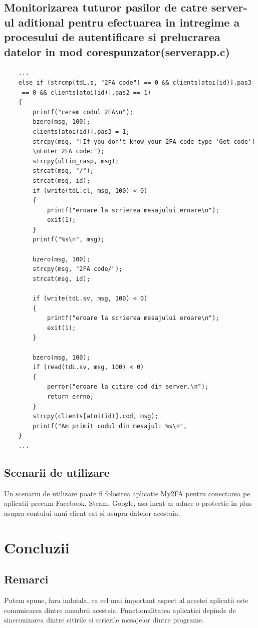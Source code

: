 \documentclass[runningheads]{llncs}
\begin{document}
\subsection{Monitorizarea tuturor pasilor de catre server-ul aditional pentru efectuarea in intregime a procesului de autentificare si prelucrarea datelor in mod corespunzator(serverapp.c)}
	\begin{verbatim}
	...
	else if (strcmp(tdL.s, "2FA code") == 0 && clients[atoi(id)].pas3
	 == 0 && clients[atoi(id)].pas2 == 1)
    {
        printf("cerem codul 2FA\n");
        bzero(msg, 100);
        clients[atoi(id)].pas3 = 1;
        strcpy(msg, "[If you don't know your 2FA code type 'Get code']
        \nEnter 2FA code:");
        strcpy(ultim_rasp, msg);
        strcat(msg, "/");
        strcat(msg, id);
        if (write(tdL.cl, msg, 100) < 0)
        {
            printf("eroare la scrierea mesajului eroare\n");
            exit(1);
        }
        printf("%s\n", msg);

        bzero(msg, 100);
        strcpy(msg, "2FA code/");
        strcat(msg, id);

        if (write(tdL.sv, msg, 100) < 0)
        {
            printf("eroare la scrierea mesajului eroare\n");
            exit(1);
        }

        bzero(msg, 100);
        if (read(tdL.sv, msg, 100) < 0)
        {
            perror("eroare la citire cod din server.\n");
            return errno;
        }
        strcpy(clients[atoi(id)].cod, msg);
        printf("Am primit codul din mesajul: %s\n", 
    }
    ...
\end{verbatim}
\subsection{Scenarii de utilizare}
\hspace{10pt} Un scenariu de utilizare poate fi folosirea aplicatie My2FA pentru conectarea pe aplicatii precum Facebook, Steam, Google, asa incat ar aduce o protectie in plus asupra contului unui client cat si asupra datelor acestuia.
\section{Concluzii}
\subsection{Remarci}
\hspace{10pt} Putem spune, fara indoiala, ca cel mai important aspect al acestei aplicatii este comunicarea dintre membrii acesteia. Functionalitatea aplicatiei depinde de sincronizarea dintre citirile si scrierile mesajelor dintre programe. 
\end{document}
